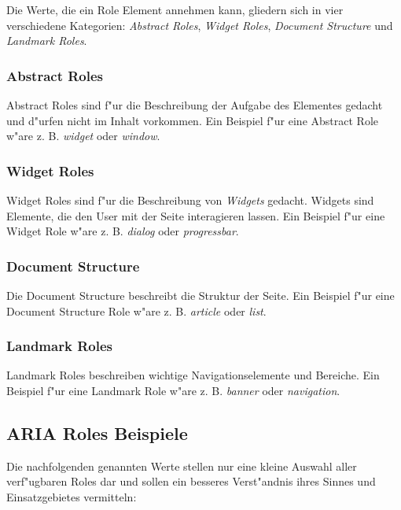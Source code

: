 \documentclass[a4paper,bibtotoc,oneside]{scrbook}
\begin{document}
Die Werte, die ein Role Element annehmen kann, gliedern sich in vier verschiedene Kategorien: \emph{Abstract Roles}, \emph{Widget Roles}, \emph{Document Structure} und \emph{Landmark Roles}. \cite[Abschnitt 5.2]{aria_states}


\subsubsection{Abstract Roles}
Abstract Roles sind f"ur die Beschreibung der Aufgabe des Elementes gedacht und d"urfen nicht im Inhalt vorkommen. Ein Beispiel f"ur eine Abstract Role w"are z. B. \emph{widget} oder \emph{window}.\cite[Abschnitt 5.3.1]{aria_roles}

\subsubsection{Widget Roles}
Widget Roles sind f"ur die Beschreibung von \emph{Widgets} gedacht. Widgets sind Elemente, die den User mit der Seite interagieren lassen\cite[Abschnitt 5.4, widget]{aria_roles}. Ein Beispiel f"ur eine Widget Role w"are z. B. \emph{dialog} oder \emph{progressbar}.\cite[Abschnitt 5.3.2]{aria_roles}

\subsubsection{Document Structure}
Die Document Structure beschreibt die Struktur der Seite. Ein Beispiel f"ur eine Document Structure Role w"are z. B. \emph{article} oder \emph{list}.\cite[Abschnitt 5.3.3]{aria_roles}

\subsubsection{Landmark Roles}
Landmark Roles beschreiben wichtige Navigationselemente und Bereiche. Ein Beispiel f"ur eine Landmark Role w"are z. B. \emph{banner} oder \emph{navigation}.\cite[Abschnitt 5.3.4]{aria_roles}

\subsection{ARIA Roles Beispiele}
Die nachfolgenden genannten Werte stellen nur eine kleine Auswahl aller verf"ugbaren Roles dar und sollen ein besseres Verst"andnis ihres Sinnes und  Einsatzgebietes vermitteln:
\end{document}
